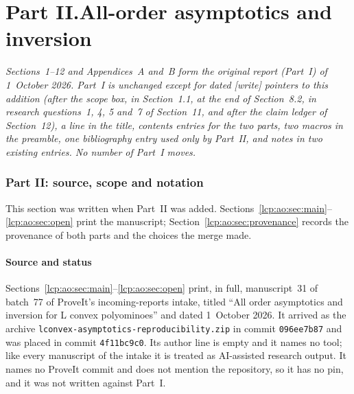 \documentclass[11pt]{article}
\numberwithin{equation}{section}
\theoremstyle{definition}\newtheorem{definition}[theorem]{Definition}
\theoremstyle{remark}\newtheorem{remark}[theorem]{Remark}
\begin{document}
\clearpage
{}\part*{Part II.\quad All-order asymptotics and inversion}

\noindent\emph{Sections~1--12 and Appendices~A and~B form the original
report (Part~I) of 1~October 2026. Part~I is unchanged except for dated
\textsf{[write]} pointers to this addition (after the scope box, in
Section~1.1, at the end of Section~8.2, in research questions~1, 4, 5
and~7 of Section~11, and after the claim ledger of Section~12), a line in
the title, contents entries for the two parts, two macros in the preamble,
one bibliography entry used only by Part~II, and notes in two existing
entries. No number of Part~I moves.}

\section{Part II: source, scope and notation}\label{lcp:ao:sec:intro}
This section was written when Part~II was added. Sections~\ref{lcp:ao:sec:main}--\ref{lcp:ao:sec:open}
print the manuscript; Section~\ref{lcp:ao:sec:provenance} records the
provenance of both parts and the choices the merge made.

\subsection{Source and status}
Sections~\ref{lcp:ao:sec:main}--\ref{lcp:ao:sec:open} print, in full,
manuscript~31 of batch~77 of ProveIt's incoming-reports intake, titled
``All order asymptotics and inversion for L convex polyominoes'' and dated
1~October 2026. It arrived as the archive
\texttt{lconvex-\allowbreak asymptotics-\allowbreak reproducibility.zip}
in commit \texttt{096ee7b87} and was placed in commit \texttt{4f11bc9c0}.
Its author line is empty and it names no tool; like every manuscript of
the intake it is treated as AI-assisted research output. It names no
ProveIt commit and does not mention the repository, so it has no pin, and
it was not written against Part~I.
\end{document}
